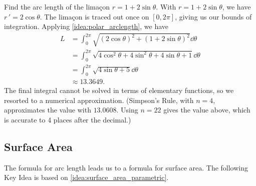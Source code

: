\begin{example}\label{ex_polcalc7}%
Find the arc length of the limaçon $r=1+2\sin\theta$.
\solution
With $r=1+2\sin\theta$, we have $r\,' = 2\cos\theta$. The limaçon is traced out once on $[0,2\pi]$, giving us our bounds of integration. Applying \autoref{idea:polar_arclength}, we have
\begin{align*}
	L
	&= \int_0^{2\pi} \sqrt{(2\cos\theta)^2+(1+2\sin\theta)^2}\dd\theta \\
	&=	\int_0^{2\pi} \sqrt{4\cos^2\theta+4\sin^2\theta +4\sin\theta+1}\dd\theta\\
	&=	\int_0^{2\pi} \sqrt{4\sin\theta+5}\dd\theta\\
	&\approx 13.3649.
\end{align*}
%
%
The final integral cannot be solved in terms of elementary functions, so we resorted to a numerical approximation. (Simpson's Rule, with $n=4$, approximates the value with $13.0608$. Using $n=22$ gives the value above, which is accurate to 4 places after the decimal.)
\end{example}

\subsection{Surface Area}

The formula for arc length leads us to a formula for surface area. The following Key Idea is based on \autoref{idea:surface_area_parametric}.

